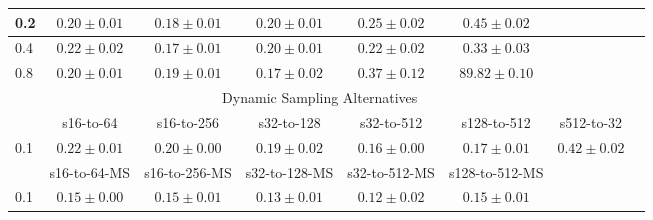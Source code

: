 \documentclass[10pt,journal,compsoc]{IEEEtran}
\begin{document}
\begin{table*}[!htbp]
\begin{center}
{\begin{tabular}{|l|c|c|c|c|c|c|c|}
\hline
0.2   & $0.20\pm0.01$ & $0.18\pm0.01$ & $0.20\pm0.01$ & $0.25\pm0.02$ & $0.45\pm0.02$ & \\
\hline
0.4   & $0.22\pm0.02$ & $0.17\pm0.01$ & $0.20\pm0.01$ & $0.22\pm0.02$ & $0.33\pm0.03$ & \\
\hline
0.8   & $0.20\pm0.01$ & $0.19\pm0.01$ & $0.17\pm0.02$ & $0.37\pm0.12$ & $89.82\pm0.10$ & \\
\hline
\multicolumn{7}{|c|}{Dynamic Sampling Alternatives}\\
\hline
& s16-to-64 & s16-to-256  & s32-to-128 & s32-to-512 & s128-to-512 & s512-to-32 \\
\hline
0.1  & $0.22\pm0.01$ & $0.20\pm0.00$ & $0.19\pm0.02$ &  $0.16\pm0.00$ & $0.17\pm0.01$ & $0.42\pm0.02$ \\
\hline
& s16-to-64-MS & s16-to-256-MS & s32-to-128-MS & s32-to-512-MS & s128-to-512-MS & \\
\hline
0.1  & $0.15\pm0.00$ & $0.15\pm0.01$ & $0.13\pm0.01$ & $0.12\pm0.02$ & $0.15\pm0.01$ & \\
\hline


\end{tabular}}
\end{center}
\end{table*}
\end{document}
